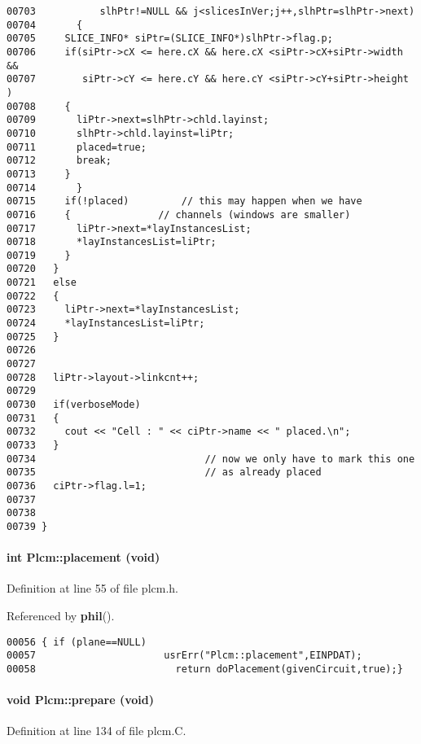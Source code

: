 \begin{verbatim}
00703           slhPtr!=NULL && j<slicesInVer;j++,slhPtr=slhPtr->next)
00704       {
00705     SLICE_INFO* siPtr=(SLICE_INFO*)slhPtr->flag.p;
00706     if(siPtr->cX <= here.cX && here.cX <siPtr->cX+siPtr->width &&
00707        siPtr->cY <= here.cY && here.cY <siPtr->cY+siPtr->height )
00708     {
00709       liPtr->next=slhPtr->chld.layinst;
00710       slhPtr->chld.layinst=liPtr;
00711       placed=true;
00712       break;
00713     }
00714       }
00715     if(!placed)         // this may happen when we have 
00716     {               // channels (windows are smaller)
00717       liPtr->next=*layInstancesList;
00718       *layInstancesList=liPtr; 
00719     }
00720   }
00721   else
00722   {
00723     liPtr->next=*layInstancesList;
00724     *layInstancesList=liPtr; 
00725   }
00726 
00727 
00728   liPtr->layout->linkcnt++;
00729 
00730   if(verboseMode)
00731   {
00732     cout << "Cell : " << ciPtr->name << " placed.\n";
00733   }
00734                             // now we only have to mark this one
00735                             // as already placed
00736   ciPtr->flag.l=1;
00737 
00738 
00739 }
\end{verbatim}\normalsize 
\label{Plcm_a5}
\paragraph{\setlength{\rightskip}{0pt plus 5cm}int Plcm::placement (void)\hspace{0.3cm}{\tt  [inline]}}\hfill



Definition at line 55 of file plcm.h.

Referenced by {\bf phil}().\small\begin{verbatim}00056 { if (plane==NULL)
00057                      usrErr("Plcm::placement",EINPDAT);
00058                        return doPlacement(givenCircuit,true);}
\end{verbatim}\normalsize 
\label{Plcm_a3}
\paragraph{\setlength{\rightskip}{0pt plus 5cm}void Plcm::prepare (void)}\hfill



Definition at line 134 of file plcm.C.

